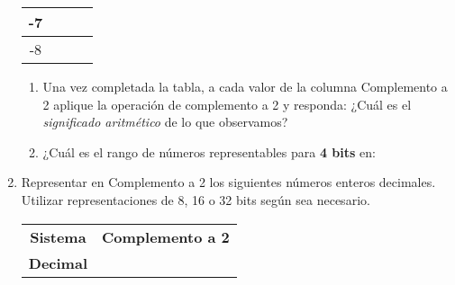 \documentclass[12pt]{article}
\begin{document}
\begin{enumerate}
\begin{center}
\begin{tabular}[t]{|c|c|c|c|}
                -7&&&\\

            \hline

                -8&&&\\

            \hline

            \end{tabular}

        \end{center}

        \begin{enumerate}
                
            \item Una vez completada la tabla, a cada valor de la columna
                Complemento a 2 aplique la operación de complemento a 2 y
                responda: ¿Cuál es el \emph{significado aritmético} de lo que
                observamos?

            \item ¿Cuál es el rango de números representables para \textbf{4
                bits} en:


    \end{enumerate}

    \item Representar en Complemento a 2 los siguientes números enteros
        decimales. Utilizar representaciones de 8, 16 o 32 bits según sea
        necesario.

        \begin{center}

            \begin{tabular}[t]{|c|c|}

            \hline

                \textbf{Sistema} & \textbf{Complemento a 2}\\

                \textbf{Decimal} & ~ \\


\end{tabular}
\end{center}
\end{enumerate}
\end{document}
